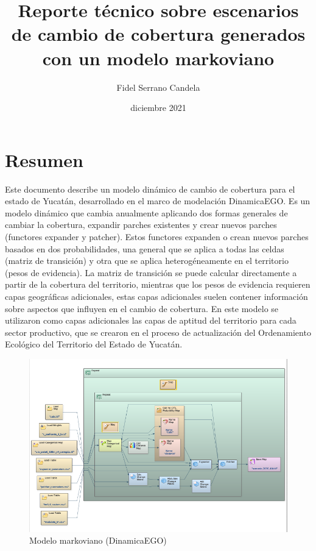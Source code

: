 \documentclass[12pt,a4paper,oldfontcommands]{article}
\title{Reporte técnico sobre escenarios de cambio de cobertura generados con un modelo markoviano}
\author{Fidel Serrano Candela}
\date{diciembre 2021}
\begin{document}
\maketitle

\newpage

\tableofcontents

\newpage

\section{Resumen}

Este documento describe un modelo dinámico de cambio de cobertura para el estado de Yucatán, desarrollado en el marco de modelación DinamicaEGO. Es un modelo dinámico que cambia anualmente aplicando dos formas generales de cambiar la cobertura, expandir parches existentes y crear nuevos parches (functores expander y patcher). Estos functores expanden o crean nuevos parches basados en dos probabilidades, una general que se aplica a todas las celdas (matriz de transición) y otra que se aplica heterogéneamente en el territorio (pesos de evidencia). La matriz de transición se puede calcular directamente a partir de la cobertura del territorio, mientras que los pesos de evidencia requieren capas geográficas adicionales, estas capas adicionales suelen contener información sobre aspectos que influyen en el cambio de cobertura. En este modelo se utilizaron como capas adicionales las capas de aptitud del territorio para cada sector productivo, que se crearon en el proceso de actualización del Ordenamiento Ecológico del Territorio del Estado de Yucatán. 

\begin{figure}[h]
	\centering
	\includegraphics[width=1\textwidth]{./figuras/modelo.png}
	\caption{Modelo markoviano (DinamicaEGO)}
\end{figure}
\end{document}
